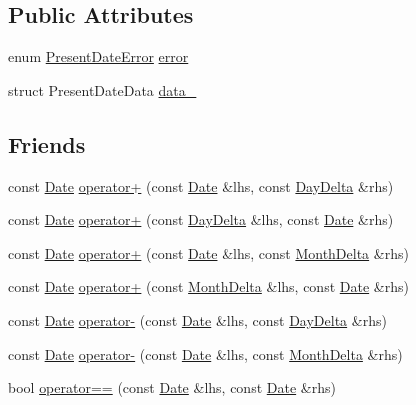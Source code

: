 \subsection*{\-Public \-Attributes}
\begin{DoxyCompactItemize}
\item 
enum \hyperlink{date_8h_a42798e6b91456e88f492437d3e826c0b}{\-Present\-Date\-Error} \hyperlink{structDate_adb2a42cb857f6462788b856b2f60cfb2}{error}
\item 
struct \-Present\-Date\-Data \hyperlink{structDate_a15a7ce699435bf3c9c60bfff5e1806de}{data\-\_\-}
\end{DoxyCompactItemize}
\subsection*{\-Friends}
\begin{DoxyCompactItemize}
\item 
const \hyperlink{structDate}{\-Date} \hyperlink{structDate_a88a01e03ad6e96a22ee81ed7a38bdd5a}{operator+} (const \hyperlink{structDate}{\-Date} \&lhs, const \hyperlink{structDayDelta}{\-Day\-Delta} \&rhs)
\item 
const \hyperlink{structDate}{\-Date} \hyperlink{structDate_a064b881a2d6c0460119fee5d230c28e4}{operator+} (const \hyperlink{structDayDelta}{\-Day\-Delta} \&lhs, const \hyperlink{structDate}{\-Date} \&rhs)
\item 
const \hyperlink{structDate}{\-Date} \hyperlink{structDate_a0c895c337e87874cc232482d703db30e}{operator+} (const \hyperlink{structDate}{\-Date} \&lhs, const \hyperlink{structMonthDelta}{\-Month\-Delta} \&rhs)
\item 
const \hyperlink{structDate}{\-Date} \hyperlink{structDate_a7650e3aaeb267ba50ea3b3541e067e35}{operator+} (const \hyperlink{structMonthDelta}{\-Month\-Delta} \&lhs, const \hyperlink{structDate}{\-Date} \&rhs)
\item 
const \hyperlink{structDate}{\-Date} \hyperlink{structDate_a10a73b5010e589b98f3929f9b36e2387}{operator-\/} (const \hyperlink{structDate}{\-Date} \&lhs, const \hyperlink{structDayDelta}{\-Day\-Delta} \&rhs)
\item 
const \hyperlink{structDate}{\-Date} \hyperlink{structDate_a61933f732562f4d15602110136ad536c}{operator-\/} (const \hyperlink{structDate}{\-Date} \&lhs, const \hyperlink{structMonthDelta}{\-Month\-Delta} \&rhs)
\item 
bool \hyperlink{structDate_a27425be265a0cc57e4f731825154ec4d}{operator==} (const \hyperlink{structDate}{\-Date} \&lhs, const \hyperlink{structDate}{\-Date} \&rhs)

\end{DoxyCompactItemize}

